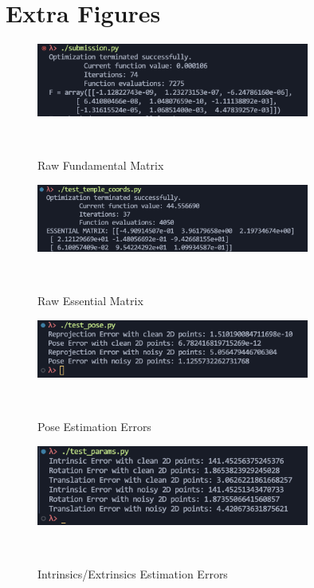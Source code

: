 \appendix

\section{Extra Figures}

\begin{figure}[H]
  \centering
  \includegraphics[width=0.8\textwidth]{./figures/raw-f.png}
  \caption{Raw Fundamental Matrix}~\label{fig:raw-f}
\end{figure}

\begin{figure}[H]
  \centering
  \includegraphics[width=0.8\textwidth]{./figures/raw-e.png}
  \caption{Raw Essential Matrix}~\label{fig:raw-e}
\end{figure}


\begin{figure}[H]
  \centering
  \includegraphics[width=0.8\textwidth]{./figures/raw-pose.png}
  \caption{Pose Estimation Errors}~\label{fig:raw-pose}
\end{figure}


\begin{figure}[H]
  \centering
  \includegraphics[width=0.8\textwidth]{./figures/raw-intrinsics-error.png}
  \caption{Intrinsics/Extrinsics Estimation Errors}~\label{fig:raw-intrinsics-error}
\end{figure}
